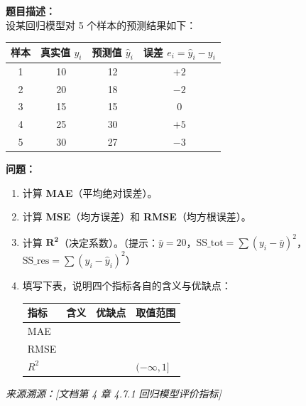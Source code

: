 \documentclass[a4paper,11pt]{ctexart}
\begin{document}
\begin{problembox}
    \textbf{题目描述：}\\
    设某回归模型对 5 个样本的预测结果如下：

    \begin{center}
    \begin{tabular}{cccc}
        \toprule
        样本 & 真实值 $y_i$ & 预测值 $\hat{y}_i$ & 误差 $e_i = \hat{y}_i - y_i$ \\
        \midrule
        1 & 10 & 12 & $+2$ \\
        2 & 20 & 18 & $-2$ \\
        3 & 15 & 15 & $0$ \\
        4 & 25 & 30 & $+5$ \\
        5 & 30 & 27 & $-3$ \\
        \bottomrule
    \end{tabular}
    \end{center}

    \textbf{问题：}
    \begin{enumerate}[(1)]
        \item 计算 \textbf{MAE}（平均绝对误差）。
        \item 计算 \textbf{MSE}（均方误差）和 \textbf{RMSE}（均方根误差）。
        \item 计算 $\mathbf{R^2}$（决定系数）。（提示：$\bar{y} = 20$，$\text{SS\_tot} = \sum(y_i-\bar{y})^2$，$\text{SS\_res} = \sum(y_i-\hat{y}_i)^2$）
        \item 填写下表，说明四个指标各自的含义与优缺点：
        \begin{center}
        \begin{tabular}{p{2cm} p{4cm} p{4.5cm} p{2cm}}
            \toprule
            指标 & 含义 & 优缺点 & 取值范围 \\
            \midrule
            MAE & \underline{\hspace{3.5cm}} & \underline{\hspace{4cm}} & \underline{\quad} \\[1.2em]
            RMSE & \underline{\hspace{3.5cm}} & \underline{\hspace{4cm}} & \underline{\quad} \\[1.2em]
            $R^2$ & \underline{\hspace{3.5cm}} & \underline{\hspace{4cm}} & $(-\infty, 1]$ \\
            \bottomrule
        \end{tabular}
        \end{center}
    \end{enumerate}
    {\color{gray}\small\textit{来源溯源：[文档第 4 章 4.7.1 回归模型评价指标]}}
\end{problembox}
\end{document}
